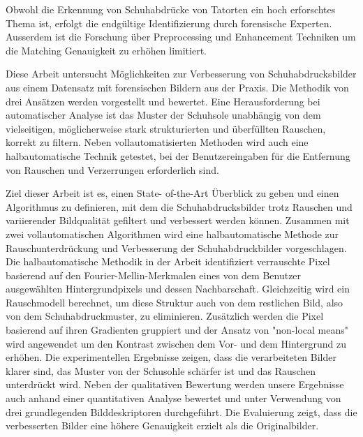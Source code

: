 \documentclass[draft,final]{vutinfth} %
\begin{document}
\begin{kurzfassung}
\par
Obwohl die Erkennung von Schuhabdrücke von Tatorten ein hoch erforschtes Thema ist, erfolgt die endgültige Identifizierung  durch forensische Experten.
Ausserdem ist die Forschung über Preprocessing und Enhancement Techniken um die Matching Genauigkeit zu erhöhen limitiert.
\par
Diese Arbeit untersucht Möglichkeiten zur Verbesserung von Schuhabdrucksbilder aus einem Datensatz mit forensischen Bildern aus der Praxis. 
Die Methodik von drei Ansätzen werden vorgestellt und bewertet. 
Eine Herausforderung bei automatischer Analyse ist das Muster der Schuhsole unabhängig von dem vielseitigen, möglicherweise stark strukturierten und überfüllten Rauschen, korrekt zu filtern.
Neben vollautomatisierten Methoden wird auch eine halbautomatische Technik getestet, bei der Benutzereingaben für die Entfernung von Rauschen und Verzerrungen erforderlich sind. 
\par
Ziel dieser Arbeit ist es, einen State- of-the-Art Überblick zu geben und einen Algorithmus zu definieren, mit dem die Schuhabdrucksbilder trotz Rauschen und variierender Bildqualität gefiltert und verbessert werden können.
Zusammen mit zwei vollautomatischen Algorithmen wird eine halbautomatische Methode zur Rauschunterdrückung und Verbesserung der Schuhabdruckbilder vorgeschlagen. 
Die halbautomatische Methodik in der Arbeit identifiziert verrauschte Pixel basierend auf den Fourier-Mellin-Merkmalen eines von dem Benutzer ausgewählten Hintergrundpixels und dessen Nachbarschaft. 
Gleichzeitig wird ein Rauschmodell berechnet, um diese Struktur auch von dem restlichen Bild, also von dem Schuhabdruckmuster, zu eliminieren. 
Zusätzlich werden die Pixel basierend auf ihren Gradienten gruppiert und der Ansatz von "non-local means" wird angewendet um den Kontrast zwischen dem Vor- und dem Hintergrund zu erhöhen.
Die experimentellen Ergebnisse zeigen, dass die verarbeiteten Bilder klarer sind, das Muster von der Schusohle schärfer ist und das Rauschen unterdrückt wird. 
Neben der qualitativen Bewertung werden unsere Ergebnisse auch anhand einer quantitativen Analyse bewertet und unter Verwendung von drei grundlegenden Bilddeskriptoren durchgeführt.
Die Evaluierung zeigt, dass die verbesserten Bilder eine höhere Genauigkeit erzielt als die Originalbilder.

\end{kurzfassung}
\end{document}
